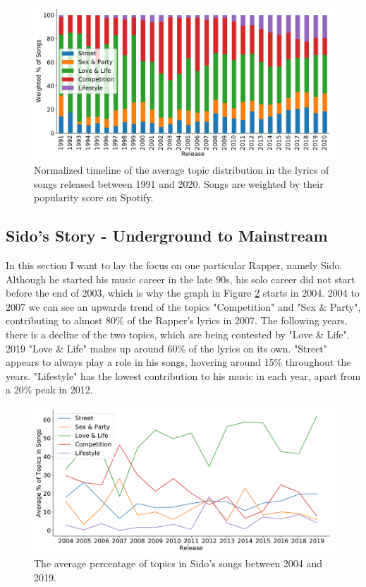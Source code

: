 \documentclass[conference]{IEEEtran}
\begin{document}
\begin{figure}[!t]
\includegraphics[width=\linewidth]{figures/w_timeline.pdf}
\vspace*{-8mm}
\caption{Normalized timeline of the average topic distribution in the lyrics of songs released between 1991 and 2020. Songs are weighted by their popularity score on Spotify.}
\label{fig:w_timeline}
\end{figure}

\subsection{Sido's Story - Underground to Mainstream}
In this section I want to lay the focus on one particular Rapper, namely Sido. Although he started his music career in the late 90s, his solo career did not start before the end of 2003, which is why the graph in Figure \ref{fig:sido} starts in 2004. 2004 to 2007 we can see an upwards trend of the topics "Competition" and "Sex \& Party", contributing to almost 80\% of the Rapper's lyrics in 2007. The following years, there is a decline of the two topics, which are being contested by "Love \& Life". 2019 "Love \& Life" makes up around 60\% of the lyrics on its own. "Street" appears to always play a role in his songs, hovering around 15\% throughout the years. "Lifestyle" has the lowest contribution to his music in each year, apart from a 20\% peak in 2012.

\begin{figure}[!t]
\includegraphics[width=\linewidth]{figures/sido.pdf}
\vspace*{-8mm}
\caption{The average percentage of topics in Sido's songs between 2004 and 2019.}
\label{fig:sido}
\end{figure}
\end{document}

